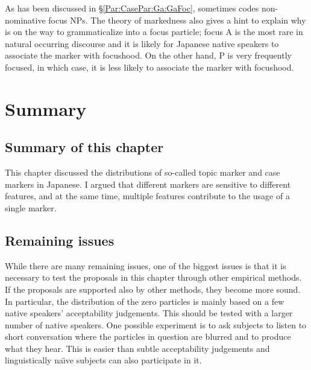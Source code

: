 As has been discussed in \S \ref{Par:CasePar:Ga:GaFoc},
 sometimes codes non-nominative focus NPs.
The theory of markedness also gives a hint to explain why  is on the way to grammaticalize into a focus particle;
focus A is the most rare in natural occurring discourse
and it is likely for Japanese native speakers to associate the marker  with focushood.
On the other hand, P is very frequently focused,
in which case, it is less likely to associate the marker  with focushood.




\section{Summary}

\subsection{Summary of this chapter}

This chapter discussed the distributions of so-called topic marker and case markers in Japanese.
I argued that
different markers are sensitive to different features, and
at the same time,
 multiple features contribute to the usage of a single marker.


\subsection{Remaining issues}

While there are many remaining issues,
one of the biggest issues is that
it is necessary to test the proposals in this chapter through other empirical methods.
If the proposals are supported also by other methods,
they become more sound.
In particular, the distribution of the zero particles is mainly based on a few native speakers' acceptability judgements.
This should be tested with a larger number of native speakers.
One possible experiment is to ask subjects to listen to short conversation where the particles in question are blurred
and to produce what they hear.
This is easier than subtle acceptability judgements and linguistically na\"{\i}ve subjects can also participate in it.

